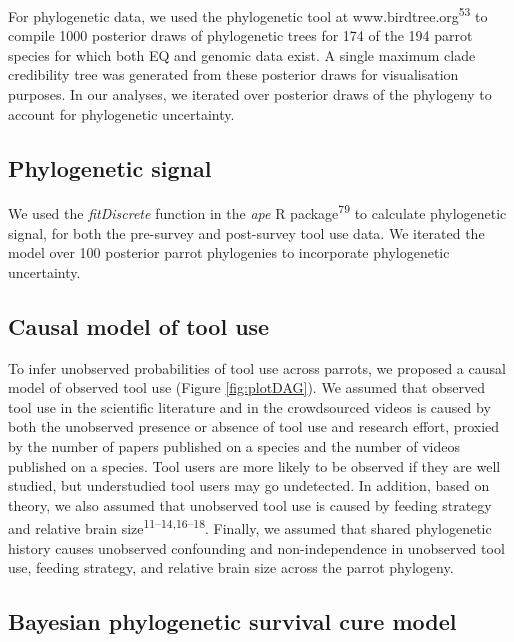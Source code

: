 \documentclass[
  man,floatsintext]{apa6}
\begin{document}
For phylogenetic data, we used the phylogenetic tool at www.birdtree.org\textsuperscript{53} to compile 1000 posterior draws of phylogenetic trees for 174 of the
194 parrot species for which both EQ and genomic data exist. A single maximum
clade credibility tree was generated from these posterior draws for
visualisation purposes. In our analyses, we iterated over posterior draws of the
phylogeny to account for phylogenetic uncertainty.

\hypertarget{phylogenetic-signal}{%
\subsection{Phylogenetic signal}\label{phylogenetic-signal}}

We used the \emph{fitDiscrete} function in the \emph{ape} R package\textsuperscript{79} to
calculate phylogenetic signal, for both the pre-survey and post-survey tool use
data. We iterated the model over 100 posterior parrot phylogenies to incorporate
phylogenetic uncertainty.

\hypertarget{causal-model-of-tool-use}{%
\subsection{Causal model of tool use}\label{causal-model-of-tool-use}}

To infer unobserved probabilities of tool use across parrots, we proposed a
causal model of observed tool use (Figure \ref{fig:plotDAG}). We assumed that
observed tool use in the scientific literature and in the crowdsourced videos is
caused by both the unobserved presence or absence of tool use and research
effort, proxied by the number of papers published on a species and the number of
videos published on a species. Tool users are more likely to be observed if they
are well studied, but understudied tool users may go undetected. In addition,
based on theory, we also assumed that unobserved tool use is caused by feeding
strategy and relative brain size\textsuperscript{11--14,16--18}. Finally, we
assumed that shared phylogenetic history causes unobserved confounding and
non-independence in unobserved tool use, feeding strategy, and relative brain
size across the parrot phylogeny.

\hypertarget{bayesian-phylogenetic-survival-cure-model}{%
\subsection{Bayesian phylogenetic survival cure model}\label{bayesian-phylogenetic-survival-cure-model}}
\end{document}
